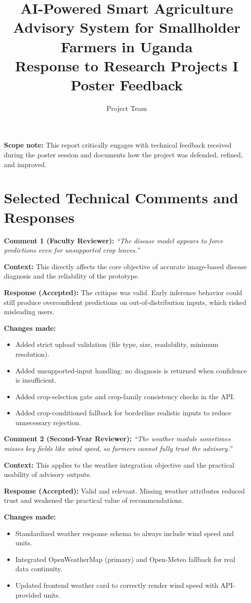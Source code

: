 \documentclass[10pt,a4paper]{article}
\title{\textbf{AI-Powered Smart Agriculture Advisory System for Smallholder Farmers in Uganda}\\[0.3em]
\large Response to Research Projects I Poster Feedback}
\author{Project Team}
\date{}
\begin{document}
\maketitle

\textbf{Scope note:} This report critically engages with technical feedback received during the poster session and documents how the project was defended, refined, and improved.

\section*{Selected Technical Comments and Responses}

\textbf{Comment 1 (Faculty Reviewer):} \emph{``The disease model appears to force predictions even for unsupported crop leaves.''}

\textbf{Context:} This directly affects the core objective of accurate image-based disease diagnosis and the reliability of the prototype.

\textbf{Response (Accepted):} The critique was valid. Early inference behavior could still produce overconfident predictions on out-of-distribution inputs, which risked misleading users.

\textbf{Changes made:}
\begin{itemize}[noitemsep]
  \item Added strict upload validation (file type, size, readability, minimum resolution).
  \item Added unsupported-input handling: no diagnosis is returned when confidence is insufficient.
  \item Added crop-selection gate and crop-family consistency checks in the API.
  \item Added crop-conditioned fallback for borderline realistic inputs to reduce unnecessary rejection.
\end{itemize}

\textbf{Comment 2 (Second-Year Reviewer):} \emph{``The weather module sometimes misses key fields like wind speed, so farmers cannot fully trust the advisory.''}

\textbf{Context:} This applies to the weather integration objective and the practical usability of advisory outputs.

\textbf{Response (Accepted):} Valid and relevant. Missing weather attributes reduced trust and weakened the practical value of recommendations.

\textbf{Changes made:}
\begin{itemize}[noitemsep]
  \item Standardized weather response schema to always include wind speed and units.
  \item Integrated OpenWeatherMap (primary) and Open-Meteo fallback for real data continuity.
  \item Updated frontend weather card to correctly render wind speed with API-provided units.
\end{itemize}
\end{document}
